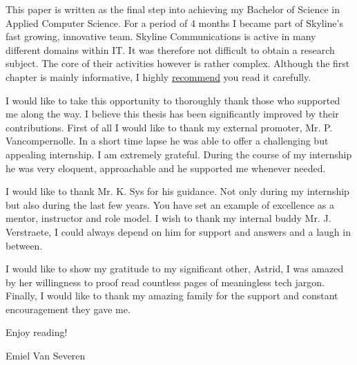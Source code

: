 This paper is written as the final step into achieving my Bachelor of Science
in Applied Computer Science. For a period of 4 months I became part of Skyline's fast growing, innovative team.
Skyline Communications is active in many different domains within IT. It was therefore not difficult to obtain
a research subject. The core of their activities however is rather complex. Although the first chapter is mainly informative, I highly \ul{recommend} you read it carefully.

I would like to take this opportunity to thoroughly thank those who supported me along the way. I believe this thesis has been significantly improved by their contributions. First of all I would like to thank my external promoter, Mr. P. Vancompernolle. In a short time lapse he was able to offer a challenging but appealing internship. I am extremely grateful.
During the course of my internship he was very eloquent, approachable and he supported me whenever needed.

I would like to thank Mr. K. Sys for his guidance. Not only during my internship but also during the last few years.
You have set an example of excellence as a mentor, instructor and role model. I wish to thank my internal buddy Mr. J. Verstraete, I could always depend on him for support and answers and a laugh in between.

I would like to show my gratitude to my significant other, Astrid, I was amazed by her willingness to proof read countless pages of meaningless tech jargon.
Finally, I would like to thank my amazing family for the support and constant encouragement they gave me.

Enjoy reading!

Emiel Van Severen

